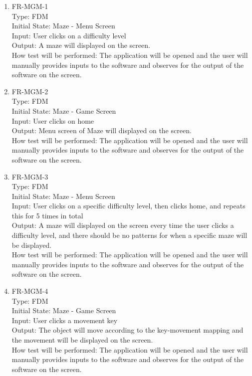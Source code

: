 \documentclass[12pt, titlepage]{article}
\begin{document}
\begin{enumerate}

\item{FR-MGM-1\\}
Type: FDM\\
Initial State: Maze - Menu Screen\\
Input: User clicks on a difficulty level\\
Output: A maze will displayed on the screen.\\
How test will be performed: The application will be opened and the user will manually provides inputs to the software and observes for the output of the software on the screen.\\

\item{FR-MGM-2\\}
Type: FDM\\
Initial State: Maze - Game Screen\\
Input: User clicks on home\\
Output: Menu screen of Maze will displayed on the screen.\\
How test will be performed: The application will be opened and the user will manually provides inputs to the software and observes for the output of the software on the screen.\\

\item{FR-MGM-3\\}
Type: FDM\\
Initial State: Maze - Menu Screen\\
Input: User clicks on a specific difficulty level, then clicks home, and repeats this for 5 times in total\\
Output: A maze will displayed on the screen every time the user clicks a difficulty level, and there should be no patterns for when a specific maze will be displayed.\\
How test will be performed: The application will be opened and the user will manually provides inputs to the software and observes for the output of the software on the screen.\\

\item{FR-MGM-4\\}
Type: FDM\\
Initial State: Maze - Game Screen\\
Input: User clicks a movement key\\
Output: The object will move according to the key-movement mapping and the movement will be displayed on the screen.\\
How test will be performed: The application will be opened and the user will manually provides inputs to the software and observes for the output of the software on the screen.\\


\end{enumerate}
\end{document}
